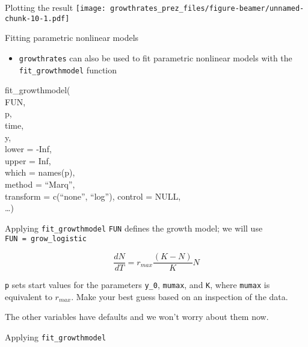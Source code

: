 \documentclass[
  ignorenonframetext,
]{beamer}
\newenvironment{Shaded}{\begin{snugshade}}{\end{snugshade}}
\newcommand{\AttributeTok}[1]{\textcolor[rgb]{0.77,0.63,0.00}{#1}}
\newcommand{\FloatTok}[1]{\textcolor[rgb]{0.00,0.00,0.81}{#1}}
\newcommand{\FunctionTok}[1]{\textcolor[rgb]{0.00,0.00,0.00}{#1}}
\newcommand{\NormalTok}[1]{#1}
\newcommand{\OtherTok}[1]{\textcolor[rgb]{0.56,0.35,0.01}{#1}}
\newcommand{\SpecialCharTok}[1]{\textcolor[rgb]{0.00,0.00,0.00}{#1}}
\providecommand{\tightlist}{%
  \setlength{\itemsep}{0pt}\setlength{\parskip}{0pt}}
\begin{document}
\begin{frame}{Plotting the result}
\protect\hypertarget{plotting-the-result}{}
\texttt{[image: growthrates\_prez\_files/figure-beamer/unnamed-chunk-10-1.pdf]}
\end{frame}

\begin{frame}[fragile]{Fitting parametric nonlinear models}
\protect\hypertarget{fitting-parametric-nonlinear-models}{}
\begin{itemize}
\tightlist
\item
  \texttt{growthrates} can also be used to fit parametric nonlinear
  models with the \texttt{fit\_growthmodel} function
\end{itemize}

fit\_growthmodel(\\
FUN,\\
p,\\
time,\\
y,\\
lower = -Inf,\\
upper = Inf,\\
which = names(p),\\
method = ``Marq'',\\
transform = c(``none'', ``log''), control = NULL,\\
\ldots)
\end{frame}

\begin{frame}[fragile]{Applying \texttt{fit\_growthmodel}}
\protect\hypertarget{applying-fit_growthmodel}{}
\texttt{FUN} defines the growth model; we will use
\texttt{FUN\ =\ grow\_logistic}

\[\frac{dN}{dT} = r_{max} \frac{(K-N)}{K} N\]

\texttt{p} sets start values for the parameters \texttt{y\_0},
\texttt{mumax}, and \texttt{K}, where \texttt{mumax} is equivalent to
\(r_{max}\). Make your best guess based on an inspection of the data.

The other variables have defaults and we won't worry about them now.
\end{frame}

\begin{frame}[fragile]{Applying \texttt{fit\_growthmodel}}
\protect\hypertarget{applying-fit_growthmodel-1}{}
\begin{Shaded}
\end{Shaded}
\end{frame}
\end{document}
